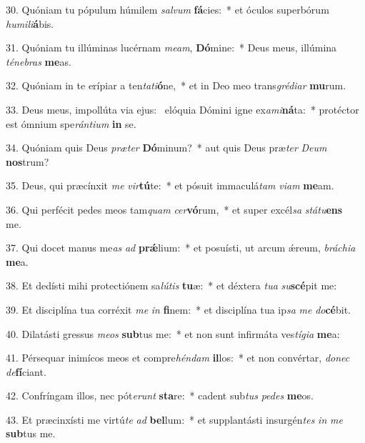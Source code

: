 30. Quóniam tu pópulum húmilem \textit{sal}\textit{vum} \textbf{fá}cies:~*  et óculos superbórum \textit{hu}\textit{mi}\textit{li}\textbf{á}bis.\

31. Quóniam tu illúminas lucérnam \textit{me}\textit{am}, \textbf{Dó}mine:~*  Deus meus, illúmina \textit{té}\textit{ne}\textit{bras} \textbf{me}as.\

32. Quóniam in te erípiar a ten\textit{ta}\textit{ti}\textbf{ó}ne,~*  et in Deo meo trans\textit{gré}\textit{di}\textit{ar} \textbf{mu}rum.\

33. Deus meus, impollúta via ejus: \dag\  elóquia Dómini igne ex\textit{a}\textit{mi}\textbf{ná}ta:~*  protéctor est ómnium spe\textit{rán}\textit{ti}\textit{um} \textbf{in} se.\

34. Quóniam quis Deus \textit{præ}\textit{ter} \textbf{Dó}minum?~*  aut quis Deus præ\textit{ter} \textit{De}\textit{um} \textbf{nos}trum?\

35. Deus, qui præcínxit \textit{me} \textit{vir}\textbf{tú}te:~*  et pósuit immaculá\textit{tam} \textit{vi}\textit{am} \textbf{me}am.\

36. Qui perfécit pedes meos tam\textit{quam} \textit{cer}\textbf{vó}rum,~*  et super excél\textit{sa} \textit{stá}\textit{tu}\textbf{ens} me.\

37. Qui docet manus me\textit{as} \textit{ad} \textbf{prǽ}lium:~*  et posuísti, ut arcum ǽreum, \textit{brá}\textit{chi}\textit{a} \textbf{me}a.\

38. Et dedísti mihi protectiónem sa\textit{lú}\textit{tis} \textbf{tu}æ:~*  et déxtera \textit{tu}\textit{a} \textit{su}\textbf{scé}pit me:\

39. Et disciplína tua corréxit \textit{me} \textit{in} \textbf{fi}nem:~*  et disciplína tua ip\textit{sa} \textit{me} \textit{do}\textbf{cé}bit.\

40. Dilatásti gressus \textit{me}\textit{os} \textbf{sub}tus me:~*  et non sunt infirmáta ves\textit{tí}\textit{gi}\textit{a} \textbf{me}a:\

41. Pérsequar inimícos meos et compre\textit{hén}\textit{dam} \textbf{il}los:~*  et non convértar, \textit{do}\textit{nec} \textit{de}\textbf{fí}ciant.\

42. Confríngam illos, nec pót\textit{e}\textit{runt} \textbf{sta}re:~*  cadent sub\textit{tus} \textit{pe}\textit{des} \textbf{me}os.\

43. Et præcinxísti me virtú\textit{te} \textit{ad} \textbf{bel}lum:~*  et supplantásti insurgén\textit{tes} \textit{in} \textit{me} \textbf{sub}tus me.\

